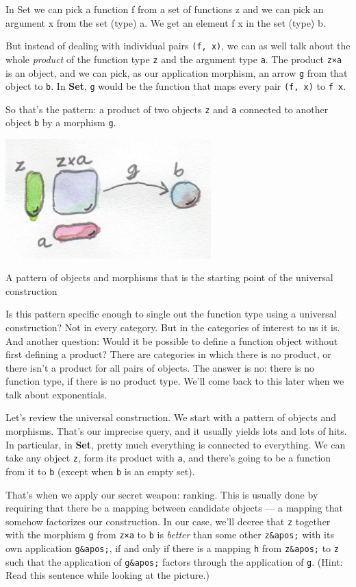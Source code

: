 In Set we can pick a function f from a set of functions z and we can
pick an argument x from the set (type) a. We get an element f x in the
set (type) b.

But instead of dealing with individual pairs \texttt{(f,\ x)}, we can as
well talk about the whole \emph{product} of the function type \texttt{z}
and the argument type \texttt{a}. The product \texttt{z×a} is an object,
and we can pick, as our application morphism, an arrow \texttt{g} from
that object to \texttt{b}. In \textbf{Set}, \texttt{g} would be the
function that maps every pair \texttt{(f,\ x)} to \texttt{f\ x}.

So that's the pattern: a product of two objects \texttt{z} and
\texttt{a} connected to another object \texttt{b} by a morphism
\texttt{g}.

\hypertarget{attachment_4244}{}
\includegraphics[width=3.12500in]{images/functionpattern.jpg}

A pattern of objects and morphisms that is the starting point of the
universal construction

Is this pattern specific enough to single out the function type using a
universal construction? Not in every category. But in the categories of
interest to us it is. And another question: Would it be possible to
define a function object without first defining a product? There are
categories in which there is no product, or there isn't a product for
all pairs of objects. The answer is no: there is no function type, if
there is no product type. We'll come back to this later when we talk
about exponentials.

Let's review the universal construction. We start with a pattern of
objects and morphisms. That's our imprecise query, and it usually yields
lots and lots of hits. In particular, in \textbf{Set}, pretty much
everything is connected to everything. We can take any object
\texttt{z}, form its product with \texttt{a}, and there's going to be a
function from it to \texttt{b} (except when \texttt{b} is an empty set).

That's when we apply our secret weapon: ranking. This is usually done by
requiring that there be a mapping between candidate objects --- a
mapping that somehow factorizes our construction. In our case, we'll
decree that \texttt{z} together with the morphism \texttt{g} from
\texttt{z×a} to \texttt{b} is \emph{better} than some other
\texttt{z\&apos;} with its own application \texttt{g\&apos;}, if and
only if there is a mapping \texttt{h} from \texttt{z\&apos;} to
\texttt{z} such that the application of \texttt{g\&apos;} factors
through the application of \texttt{g}. (Hint: Read this sentence while
looking at the picture.)

